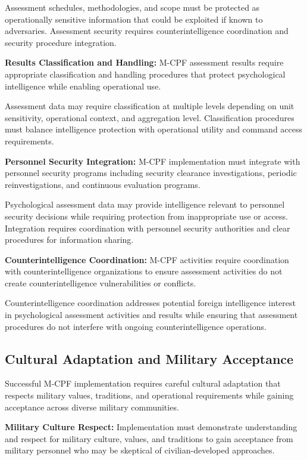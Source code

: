 \documentclass[10pt, twocolumn]{article}
\begin{document}
Assessment schedules, methodologies, and scope must be protected as operationally sensitive information that could be exploited if known to adversaries. Assessment security requires counterintelligence coordination and security procedure integration.

\textbf{Results Classification and Handling:} M-CPF assessment results require appropriate classification and handling procedures that protect psychological intelligence while enabling operational use.

Assessment data may require classification at multiple levels depending on unit sensitivity, operational context, and aggregation level. Classification procedures must balance intelligence protection with operational utility and command access requirements.

\textbf{Personnel Security Integration:} M-CPF implementation must integrate with personnel security programs including security clearance investigations, periodic reinvestigations, and continuous evaluation programs.

Psychological assessment data may provide intelligence relevant to personnel security decisions while requiring protection from inappropriate use or access. Integration requires coordination with personnel security authorities and clear procedures for information sharing.

\textbf{Counterintelligence Coordination:} M-CPF activities require coordination with counterintelligence organizations to ensure assessment activities do not create counterintelligence vulnerabilities or conflicts.

Counterintelligence coordination addresses potential foreign intelligence interest in psychological assessment activities and results while ensuring that assessment procedures do not interfere with ongoing counterintelligence operations.

\subsection{Cultural Adaptation and Military Acceptance}

Successful M-CPF implementation requires careful cultural adaptation that respects military values, traditions, and operational requirements while gaining acceptance across diverse military communities.

\textbf{Military Culture Respect:} Implementation must demonstrate understanding and respect for military culture, values, and traditions to gain acceptance from military personnel who may be skeptical of civilian-developed approaches.
\end{document}
